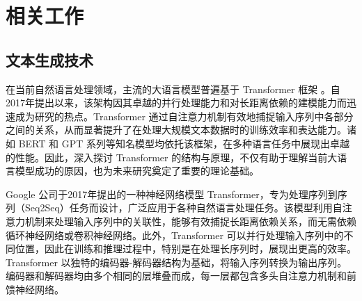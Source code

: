 

\chapter{相关工作}
\label{chap:related works}

\section{文本生成技术}
\label{sec:rw-lm}

在当前自然语言处理领域，主流的大语言模型普遍基于 Transformer 框架 \cite{transformer}。自2017年提出以来，该架构因其卓越的并行处理能力和对长距离依赖的建模能力而迅速成为研究的热点。Transformer 通过自注意力机制有效地捕捉输入序列中各部分之间的关系，从而显著提升了在处理大规模文本数据时的训练效率和表达能力。诸如 BERT 和 GPT 系列等知名模型均依托该框架，在多种语言任务中展现出卓越的性能。因此，深入探讨 Transformer 的结构与原理，不仅有助于理解当前大语言模型成功的原因，也为未来研究奠定了重要的理论基础。

Google 公司于2017年提出的一种神经网络模型 Transformer，专为处理序列到序列（Seq2Seq）任务而设计，广泛应用于各种自然语言处理任务。该模型利用自注意力机制来处理输入序列中的关联性，能够有效捕捉长距离依赖关系，而无需依赖循环神经网络或卷积神经网络。此外，Transformer 可以并行处理输入序列中的不同位置，因此在训练和推理过程中，特别是在处理长序列时，展现出更高的效率。Transformer 以独特的编码器-解码器结构为基础，将输入序列转换为输出序列。编码器和解码器均由多个相同的层堆叠而成，每一层都包含多头自注意力机制和前馈神经网络。

